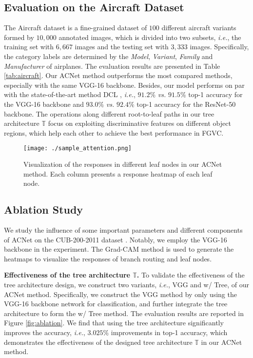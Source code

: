 \documentclass[10pt,twocolumn,letterpaper]{article}
\def\ie{{\em i.e.}}
\begin{document}
\subsection{Evaluation on the Aircraft Dataset}
The Aircraft dataset \cite{maji13fine-grained} is a fine-grained dataset of $100$ different aircraft variants formed by $10,000$ annotated images, which is divided into two subsets, \ie, the training set with $6,667$ images and the testing set with $3,333$ images. Specifically, the category labels are determined by the \textit{Model}, \textit{Variant}, \textit{Family} and \textit{Manufacturer} of airplanes. The evaluation results are presented in Table \ref{tab:aircraft}. 
Our ACNet method outperforms the most compared methods, especially with the same VGG-16 backbone. Besides, our model performs on par with the state-of-the-art method DCL \cite{Chen_2019_CVPR}, \ie, $91.2\%$ \textit{vs.} $91.5\%$ top-1 accuracy for the VGG-16 backbone and $93.0\%$ \textit{vs.} $92.4\%$ top-1 accuracy for the ResNet-50 backbone. The operations along different root-to-leaf paths in our tree architecture $\mathbb{T}$ focus on exploiting discriminative features on different object regions, which help each other to achieve the best performance in FGVC.

\begin{figure}[t]
\centering
\texttt{[image: ./sample\_attention.png]}
\caption{Visualization of the responses in different leaf nodes in our ACNet method. Each column presents a response heatmap of each leaf node.}
\label{fig:attention}
\vspace{-2mm}
\end{figure}

\subsection{Ablation Study}
We study the influence of some important parameters and different components of ACNet on the CUB-200-2011 dataset \cite{report-wahcub_200_2011}. Notably, we employ the VGG-16 backbone in the experiment. The Grad-CAM method \cite{DBLP:conf/iccv/SelvarajuCDVPB17} is used to generate the heatmaps to visualize the responses of branch routing and leaf nodes.

{\flushleft \textbf{Effectiveness of the tree architecture $\mathbb{T}$.}} To validate the effectiveness of the tree architecture design, we construct two variants, \ie, VGG and w/ Tree, of our ACNet method. Specifically, we construct the VGG method by only using the VGG-16 backbone network for classification, and further integrate the tree architecture to form the w/ Tree method. The evaluation results are reported in Figure \ref{fig:ablation}. We find that using the tree architecture significantly improves the accuracy, \ie, $3.025\%$ improvements in top-1 accuracy, which demonstrates the effectiveness of the designed tree architecture $\mathbb{T}$ in our ACNet method. 
\end{document}
